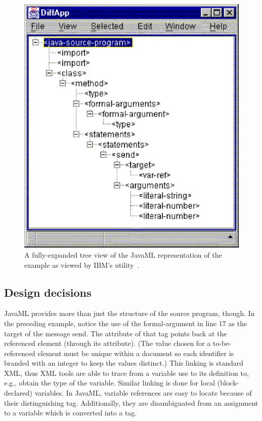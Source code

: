 \documentclass{article}
\begin{document}
\begin{figure}[tb]
\begin{centering}
\includegraphics[width=\linewidth]{treeview.eps}
\caption{A fully-expanded tree view of the JavaML representation 
of the  example as viewed by IBM's
 utility~\cite{XMLDiffMerge}.
\label{fig-treeview}}
\end{centering}
\end{figure}

\subsection{Design decisions}
\label{ssec-design}

JavaML provides more than just the structure of the source program,
though.  In the preceding example, notice the use of the formal-argument
 in line 17 as the target of the message send.  The
 attribute of that  tag points back at
the referenced  element (through its
 attribute).  (The  value chosen for a
to-be-referenced element must be unique within a document so each
identifier is branded with an integer to keep the values distinct.)
This linking is standard XML, thus XML tools are able to trace from a
variable use to its definition to, e.g., obtain the type of the
variable.  Similar linking is done for local (block-declared) variables.
In JavaML, variable references are easy to locate because of their
distinguishing  tag.  Additionally, they are
disambiguated from an assignment to a variable which is converted into a
 tag.
\end{document}
